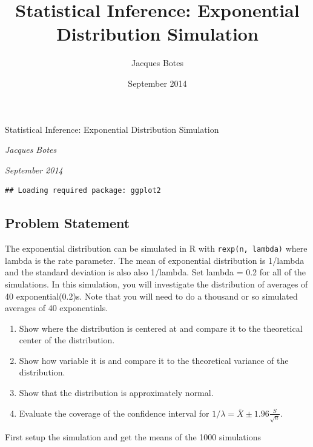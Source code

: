 \documentclass[]{article}
\title{Statistical Inference: Exponential Distribution Simulation}
\author{Jacques Botes}
\date{September 2014}
\begin{document}
\begin{center}
\huge Statistical Inference: Exponential Distribution Simulation \\[0.2cm]
\end{center}
\begin{center}
\large \emph{Jacques Botes}\\[0.1cm]
\end{center}
\begin{center}
\large \emph{September 2014} \\
\end{center}
\normalsize


\begin{verbatim}
## Loading required package: ggplot2
\end{verbatim}

\subsection{Problem Statement}\label{problem-statement}

The exponential distribution can be simulated in R with
\texttt{rexp(n, lambda)} where lambda is the rate parameter. The mean of
exponential distribution is 1/lambda and the standard deviation is also
also 1/lambda. Set lambda = 0.2 for all of the simulations. In this
simulation, you will investigate the distribution of averages of 40
exponential(0.2)s. Note that you will need to do a thousand or so
simulated averages of 40 exponentials.

\begin{enumerate}
\def\labelenumi{\arabic{enumi}.}
\itemsep1pt\parskip0pt
\item
  Show where the distribution is centered at and compare it to the
  theoretical center of the distribution.
\item
  Show how variable it is and compare it to the theoretical variance of
  the distribution.
\item
  Show that the distribution is approximately normal.
\item
  Evaluate the coverage of the confidence interval for
  $1/\lambda = \bar{X} \pm 1.96 \frac{S}{\sqrt{n}}$.
\end{enumerate}

First setup the simulation and get the means of the 1000 simulations
\end{document}
